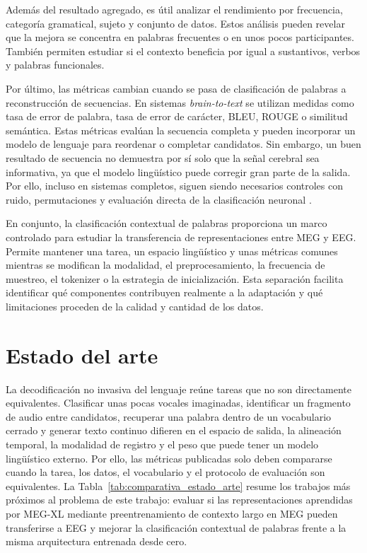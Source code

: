 Además del resultado agregado, es útil analizar el rendimiento por frecuencia, categoría gramatical, sujeto y conjunto de datos. Estos análisis pueden revelar que la mejora se concentra en palabras frecuentes o en unos pocos participantes. También permiten estudiar si el contexto beneficia por igual a sustantivos, verbos y palabras funcionales.

Por último, las métricas cambian cuando se pasa de clasificación de palabras a reconstrucción de secuencias. En sistemas \textit{brain-to-text} se utilizan medidas como tasa de error de palabra, tasa de error de carácter, BLEU, ROUGE o similitud semántica. Estas métricas evalúan la secuencia completa y pueden incorporar un modelo de lenguaje para reordenar o completar candidatos. Sin embargo, un buen resultado de secuencia no demuestra por sí solo que la señal cerebral sea informativa, ya que el modelo lingüístico puede corregir gran parte de la salida. Por ello, incluso en sistemas completos, siguen siendo necesarios controles con ruido, permutaciones y evaluación directa de la clasificación neuronal \cite{jayalath2025unlocking}.

En conjunto, la clasificación contextual de palabras proporciona un marco controlado para estudiar la transferencia de representaciones entre MEG y EEG. Permite mantener una tarea, un espacio lingüístico y unas métricas comunes mientras se modifican la modalidad, el preprocesamiento, la frecuencia de muestreo, el tokenizer o la estrategia de inicialización. Esta separación facilita identificar qué componentes contribuyen realmente a la adaptación y qué limitaciones proceden de la calidad y cantidad de los datos.

\section{Estado del arte}

La decodificación no invasiva del lenguaje reúne tareas que no son directamente equivalentes. Clasificar unas pocas vocales imaginadas, identificar un fragmento de audio entre candidatos, recuperar una palabra dentro de un vocabulario cerrado y generar texto continuo difieren en el espacio de salida, la alineación temporal, la modalidad de registro y el peso que puede tener un modelo lingüístico externo. Por ello, las métricas publicadas solo deben compararse cuando la tarea, los datos, el vocabulario y el protocolo de evaluación son equivalentes. La Tabla~\ref{tab:comparativa_estado_arte} resume los trabajos más próximos al problema de este trabajo: evaluar si las representaciones aprendidas por MEG-XL mediante preentrenamiento de contexto largo en MEG pueden transferirse a EEG y mejorar la clasificación contextual de palabras frente a la misma arquitectura entrenada desde cero.

